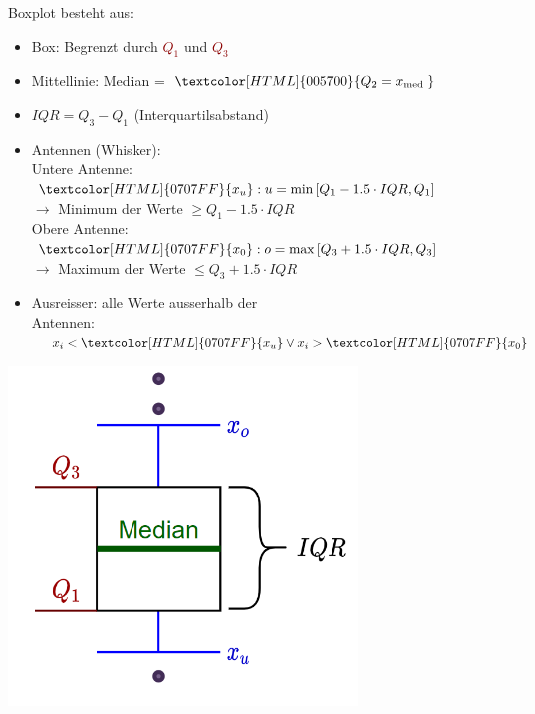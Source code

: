 \begin{definition}{Boxplot} besteht aus:

\begin{minipage}{0.62\columnwidth}
\begin{itemize}
  \setlength{\itemsep}{1pt}
  \item Box: Begrenzt durch \textcolor{darkred}{$Q_1$} und \textcolor{darkred}{$Q_3$}
  \item Mittellinie: Median = $\textcolor[HTML]{005700}{ Q_{2}=x_{\text {med }}}$
  \item $I Q R=Q_{3}-Q_{1}$ (Interquartilsabstand)
  \item Antennen (Whisker):\\
  Untere Antenne: $\textcolor[HTML]{0707FF}{x_{u}}: \\u=\min \left[Q_{1}-1.5 \cdot I Q R, Q_{1}\right]$\\
  $\rightarrow$ Minimum der Werte $\geq Q_1 - 1.5 \cdot IQR$\\
  Obere Antenne: $\textcolor[HTML]{0707FF}{x_{0}}: \\o=\max \left[Q_{3}+1.5 \cdot I Q R, Q_{3}\right]$\\
  $\rightarrow$ Maximum der Werte $\leq Q_3 + 1.5 \cdot IQR$
  \item Ausreisser: alle Werte ausserhalb der\\ Antennen:
  $\quad x_{i}<\textcolor[HTML]{0707FF}{x_{u}} \vee x_{i}>\textcolor[HTML]{0707FF}{x_{0}}$
\end{itemize}
\end{minipage}
\begin{minipage}{0.35\columnwidth}
  \includegraphics[width=\textwidth]{images/boxplot.png}
\end{minipage}
\end{definition}

